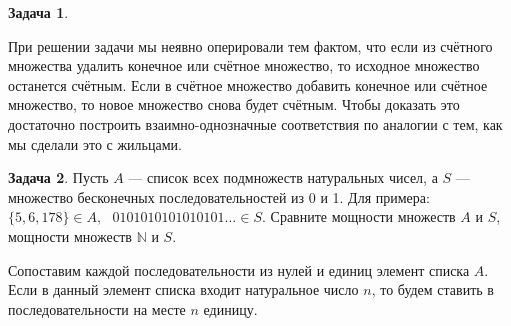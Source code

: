 \documentclass[pdftex, 12pt, a4paper]{article}
\def \mbb{\mathbb}
\def \NN{\mbb N}
\theoremstyle{definition} %
\newtheorem{problem}{Задача}
\numberwithin{problem}{section}
\numberwithin{blits}{section}
\begin{document}
\begin{problem}
\begin{sol}
\begin{enumerate}
\end{enumerate}

При решении задачи мы неявно оперировали тем фактом, что если из счётного множества удалить конечное или счётное множество, то исходное множество останется счётным. Если в счётное множество добавить конечное или счётное множество, то новое множество снова будет счётным. Чтобы доказать это достаточно построить взаимно-однозначные соответствия по аналогии с тем, как мы сделали это с жильцами.

\end{sol}
\end{problem}

\begin{problem}
Пусть $A$ --- список всех подмножеств натуральных чисел, а $S$ --- множество бесконечных последовательностей из 0 и 1. Для примера: $\{5,6,178\} \in A, \mbox{ } 0101010101010101 \ldots \in S$. Сравните мощности множеств $A$ и $S$, мощности множеств $\NN$ и $S$.
\begin{sol}
Сопоставим каждой последовательности из нулей и единиц элемент списка $A$. Если в данный элемент списка входит  натуральное число $n$, то будем ставить в последовательности на месте $n$ единицу.


\end{sol}
\end{problem}
\end{document}
